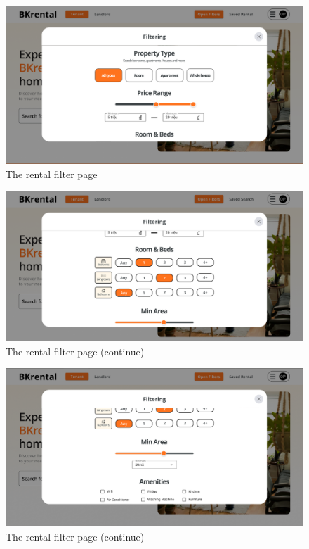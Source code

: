 \begin{figure}[ht]
    \centering
    \includegraphics[width=\textwidth]{Images/Mockup/rental_filter_1.png}
    \caption{The rental filter page}
    \label{fig:rental-filter-1} 
\end{figure}

\begin{figure}[ht]
    \centering
    \includegraphics[width=\textwidth]{Images/Mockup/rental_filter_2.png}
    \caption{The rental filter page (continue)}
    \label{fig:rental-filter-2} 
\end{figure}

\begin{figure}[ht]
    \centering
    \includegraphics[width=\textwidth]{Images/Mockup/rental_filter_3.png}
    \caption{The rental filter page (continue)}
    \label{fig:rental-filter-3} 
\end{figure}

